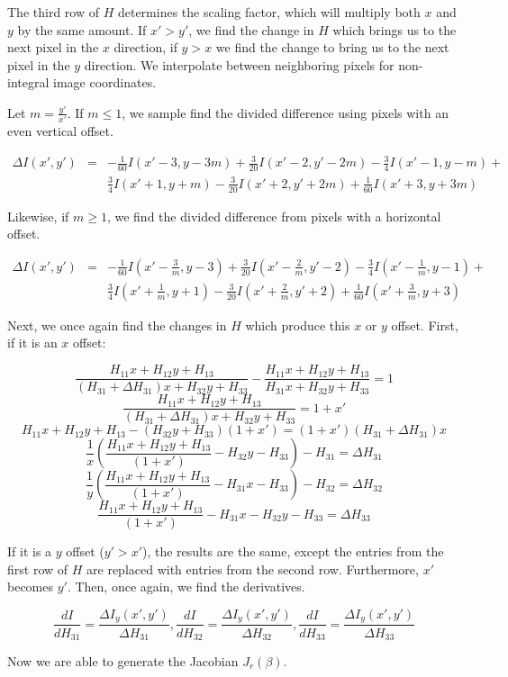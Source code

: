The third row of $H$ determines the scaling factor, which will multiply both
$x$ and $y$ by the same amount. If $x'> y'$, we find the change in $H$ which
brings us to the next pixel in the $x$ direction, if $y > x$ we find the change
to bring us to the next pixel in the $y$ direction. We interpolate between
neighboring pixels for non-integral image coordinates.

Let $m = \frac{y'}{x'}$. If $m \le 1$, we sample find the divided difference using pixels
with an even vertical offset. 

\begin{eqnarray*}
	\Delta I(x', y') &=& -\frac{1}{60}I(x'-3, y-3m) + \frac{3}{20}I(x'-2, y'-2m) - \frac{3}{4} I(x'-1, y-m) +\\
			&& \frac{3}{4} I(x'+1, y+m) -\frac{3}{20}I(x'+2, y'+2m) + \frac{1}{60}I(x'+3, y+3m)
\end{eqnarray*}

Likewise, if $m \ge 1$, we find the divided difference from pixels with a horizontal offset.

\begin{eqnarray*}
	\Delta I(x', y') &=& -\frac{1}{60}I(x'-\frac{3}{m}, y-3) + \frac{3}{20}I(x'-\frac{2}{m}, y'-2) - \frac{3}{4} I(x'-\frac{1}{m}, y-1) +\\
			&& \frac{3}{4} I(x'+\frac{1}{m}, y+1) -\frac{3}{20}I(x'+\frac{2}{m}, y'+2) + \frac{1}{60}I(x'+\frac{3}{m}, y+3)
\end{eqnarray*}

Next, we once again find the changes in $H$ which produce this $x$ or $y$ offset. First, if it is an $x$ offset:

$$\frac{H_{11} x + H_{12}y + H_{13}}{(H_{31} + \Delta H_{31})x + H_{32}y + H_{33}} - \frac{H_{11}x + H_{12}y + H_{13}}{H_{31}x + H_{32}y + H_{33}} = 1$$
$$\frac{H_{11} x + H_{12}y + H_{13}}{(H_{31} + \Delta H_{31})x + H_{32}y + H_{33}} = 1 + x'$$
$$H_{11} x + H_{12}y + H_{13} - (H_{32}y + H_{33})(1 + x') = (1 + x')\left(H_{31} + \Delta H_{31}\right)x$$
$$\frac{1}{x}\left(\frac{H_{11} x + H_{12}y + H_{13}}{(1+x')}- H_{32}y - H_{33}\right) - H_{31} = \Delta H_{31}$$
$$\frac{1}{y}\left(\frac{H_{11} x + H_{12}y + H_{13}}{(1+x')}- H_{31}x - H_{33}\right) - H_{32} = \Delta H_{32}$$
$$\frac{H_{11} x + H_{12}y + H_{13}}{(1+x')}- H_{31}x - H_{32}y - H_{33} = \Delta H_{33}$$

If it is a $y$ offset ($y' > x'$), the results are the same, except the entries from the first row of $H$ are replaced with
entries from the second row. Furthermore, $x'$ becomes $y'$. Then, once again, we find the derivatives.

$$\frac{dI}{dH_{31}} = \frac{\Delta I_y(x', y')}{\Delta H_{31}}, 
\frac{dI}{dH_{32}} = \frac{\Delta I_y(x', y')}{\Delta H_{32}}, 
\frac{dI}{dH_{33}} = \frac{\Delta I_y(x', y')}{\Delta H_{33}}$$

Now we are able to generate the Jacobian $J_r(\beta)$.

